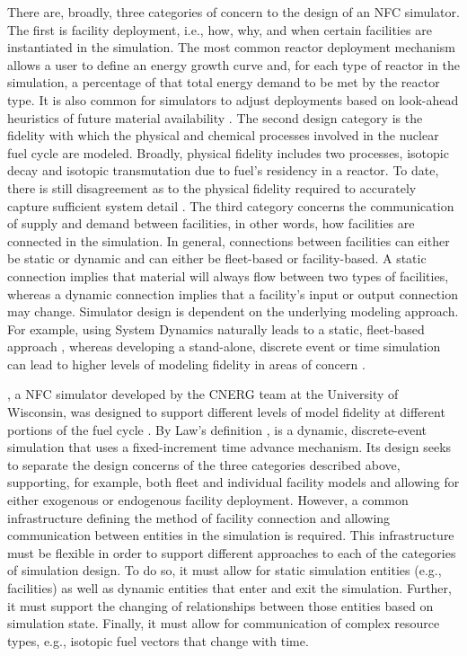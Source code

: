There are, broadly, three categories of concern to the design of an NFC
simulator. The first is facility deployment, i.e., how, why, and when certain
facilities are instantiated in the simulation. The most common reactor
deployment mechanism allows a user to define an energy growth curve and, for
each type of reactor in the simulation, a percentage of that total energy demand
to be met by the reactor type. It is also common for simulators to adjust
deployments based on look-ahead heuristics of future material availability
\cite{schweitzer_improved_2008, van_den_durpel_daness_2009}. The second design
category is the fidelity with which the physical and chemical processes involved
in the nuclear fuel cycle are modeled. Broadly, physical fidelity includes two
processes, isotopic decay and isotopic transmutation due to fuel's residency in
a reactor. To date, there is still disagreement as to the physical fidelity
required to accurately capture sufficient system detail \cite{guerin_impact_2009}. The
third category concerns the communication of supply and demand between
facilities, in other words, how facilities are connected in the simulation. In
general, connections between facilities can either be static or dynamic and can
either be fleet-based or facility-based. A static connection implies that
material will always flow between two types of facilities, whereas a dynamic
connection implies that a facility's input or output connection may
change. Simulator design is dependent on the underlying modeling approach. For
example, using System Dynamics \cite{forrester1971counterintuitive} naturally
leads to a static, fleet-based approach \cite{busquim_e_silva_system_2008,
  durpel_daness_2003, yacout_vision_2006}, whereas developing a stand-alone,
discrete event or time simulation \cite{Law:1999:SMA:554952} can lead to higher
levels of modeling fidelity in areas of concern \cite{schneider_nfcsim:_2005,
  mouginot2012class, boucher_cosi:_2006}.

\Cyclus, a NFC simulator developed by the CNERG team at the University of
Wisconsin, was designed to support different levels of model fidelity at
different portions of the fuel cycle \cite{huff_cyclus_2015}. By Law's
definition \cite{Law:1999:SMA:554952}, \Cyclus is a dynamic, discrete-event
simulation that uses a fixed-increment time advance mechanism. Its design seeks
to separate the design concerns of the three categories described above,
supporting, for example, both fleet and individual facility models and allowing
for either exogenous or endogenous facility deployment. However, a common
infrastructure defining the method of facility connection and allowing
communication between entities in the simulation is required. This
infrastructure must be flexible in order to support different approaches to each
of the categories of simulation design. To do so, it must allow for static
simulation entities (e.g., facilities) as well as dynamic entities that enter
and exit the simulation. Further, it must support the changing of relationships
between those entities based on simulation state. Finally, it must allow for
communication of complex resource types, e.g., isotopic fuel vectors that change
with time.

